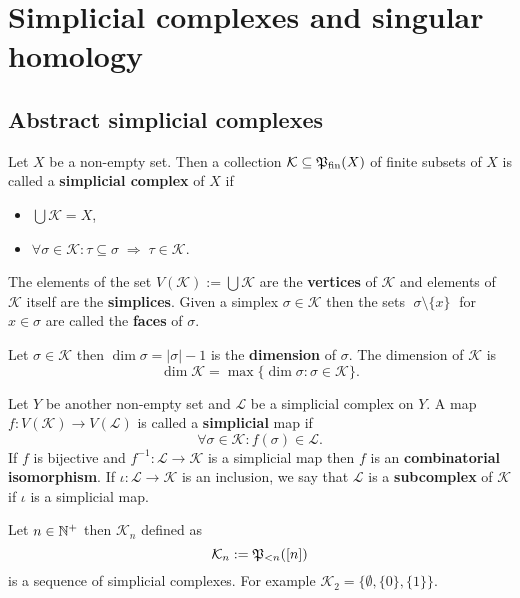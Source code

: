 \section{Simplicial complexes and singular homology}

\subsection{Abstract simplicial complexes}

\begin{defin}
    Let $X$ be a non-empty set. Then a collection $\mathcal{K} \subseteq \mathfrak{P}_{\text{fin}}(X)$ of finite subsets of $X$ is called a 
    \textbf{simplicial complex} of $X$ if
    \begin{itemize}
        \item $\bigcup \mathcal{K} = X$,
        \item $\forall \sigma\in\mathcal{K} \colon \tau \subseteq \sigma \; \Rightarrow \; \tau \in \mathcal{K}$.
    \end{itemize}
    The elements of the set $V(\mathcal{K}) := \bigcup \mathcal{K}$ are the \textbf{vertices} of $\mathcal{K}$ and
    elements of $\mathcal{K}$ itself are the \textbf{simplices}. Given a simplex $\sigma \in \mathcal{K}$ then the sets
    $\; \sigma \setminus \{x\} \;$ for $x \in \sigma$ are called the \textbf{faces} of $\sigma$.

    Let $\sigma \in \mathcal{K}$ then $\dim \sigma = |\sigma| -1$ is the \textbf{dimension} of $\sigma$. The dimension of $\mathcal{K}$ is
    \begin{equation*}
      \dim \mathcal{K} = \max\{\dim \sigma\colon \sigma \in \mathcal{K}\}.
    \end{equation*} 
    
    Let $Y$ be another non-empty set and $\mathcal{L}$ be a simplicial complex on $Y$. A map $f: V(\mathcal{K}) \to V(\mathcal{L})$ is called 
    a \textbf{simplicial} map if
    \begin{equation*}
        \forall \sigma \in \mathcal{K}\colon f(\sigma) \in \mathcal{L}.
    \end{equation*}
    If $f$ is bijective and $f^{-1}\colon \mathcal{L} \to \mathcal{K}$ is a simplicial map then $f$ is an \textbf{combinatorial isomorphism}.
    If $\iota\colon \mathcal{L} \to \mathcal{K}$ is an inclusion, we say that $\mathcal{L}$ is a \textbf{subcomplex} of $\mathcal{K}$ if $\iota$ is a simplicial map.
\end{defin}

\begin{ex}\label{ex:seqcom}
  Let $n \in \mathbb{N}^+$ then $\mathcal{K}_n$ defined as
  \begin{equation*}
    \mathcal{K}_n := \mathfrak{P}_{<n}([n])
  \end{equation*}
  is a sequence of simplicial complexes. For example $\mathcal{K}_2 = \{\emptyset, \{0\}, \{1\} \}$.
\end{ex}

